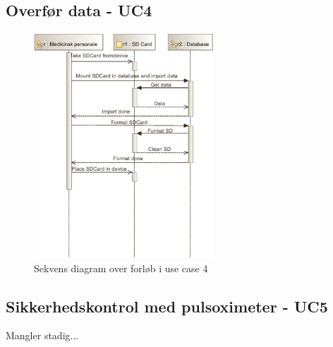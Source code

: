 \subsection{Overfør data - UC4}
\begin{figure}[H]
\begin{center}
	\includegraphics[width=0.60\textwidth]{pdfs/SD_UC4-crop.pdf}
	\caption{Sekvens diagram over forløb i use case 4}
\end{center}
\end{figure}

\newpage

\subsection{Sikkerhedskontrol med pulsoximeter - UC5}
Mangler stadig...


